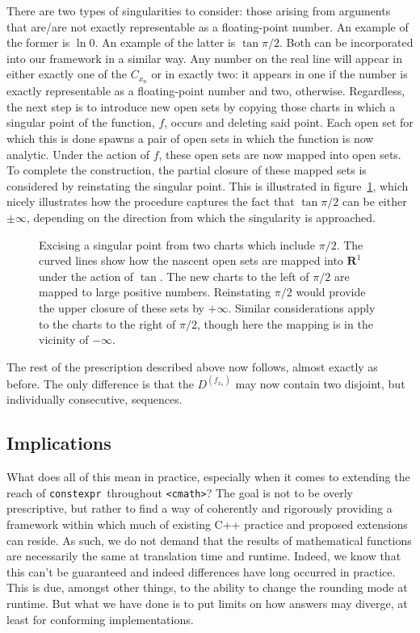 \documentclass[prd,twocolumn,amsmath,amssymb,nofootinbib,eqsecnum]{revtex4-1}
\newcommand{\constexpr}{\code{constexpr}\xspace}
\newcommand{\code}[1]{{\tt #1}}
\newcommand{\header}[1]{{\tt <#1>}}
\newcommand{\cmath}{\header{cmath}}
\newcommand{\fig}[1]{figure~\ref{fig:#1}}
\begin{document}
There are two types of singularities to consider: those arising from arguments that are/are not exactly representable as a floating-point number. An example of the former is $\ln 0$. An example of the latter is $\tan \pi/2$. Both can be incorporated into our framework in a similar way. Any number on the real line will appear in either exactly one of the $C_{x_n}$ or in exactly two: it appears in one if the number is exactly representable as a floating-point number and two, otherwise. Regardless, the next step is to introduce new open sets by copying those charts in which a singular point of the function, $f$, occurs and deleting said point. Each open set for which this is done spawns a pair of open sets in which the function is now analytic. Under the action of $f$, these open sets are now mapped into open sets. To complete the construction, the partial closure of these mapped sets is considered by reinstating the singular point. This is illustrated in \fig{Singularity}, which nicely illustrates how the procedure captures the fact that $\tan \pi/2$ can be either $\pm \infty$, depending on the direction from which the singularity is approached.
\begin{figure}[h]
\begin{center}
\resizebox{25em}{!}{}
\caption{Excising a singular point from two charts which include $\pi/2$. The curved lines show how the nascent open sets are mapped into $\mathbf{R}^1$ under the action of $\tan$. The new charts to the left of $\pi/2$ are mapped to large positive numbers. Reinstating $\pi/2$ would provide the upper closure of these sets by $+\infty$. Similar considerations apply to the charts to the right of $\pi/2$, though here the mapping is in the vicinity of $-\infty$.}
\label{fig:Singularity}
\end{center}
\end{figure}

The rest of the prescription described above now follows, almost exactly as before. The only difference is that the $D^{(f_{x_n})}$ may now contain two disjoint, but individually consecutive, sequences.

\subsection{Implications}

What does all of this mean in practice, especially when it comes to extending the reach of \constexpr\ throughout \cmath? The goal is not to be overly prescriptive, but rather to find a way of coherently and rigorously providing a framework  within which much of existing C++ practice and proposed extensions can reside. As such, we do not demand that the results of mathematical functions are necessarily the same at translation time and runtime. Indeed, we know that this can't be guaranteed and indeed differences have long occurred in practice. This is due, amongst other things, to the ability to change the rounding mode at runtime. But what we have done is to put limits on how answers may diverge, at least for conforming implementations.
\end{document}
